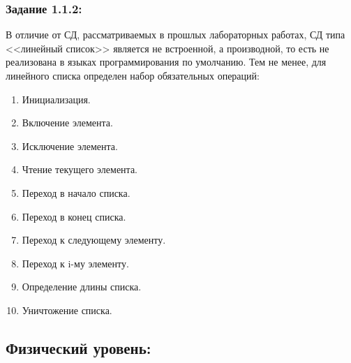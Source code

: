 \documentclass[12pt]{article}
\begin{document}
{	\subsubsection{Задание 1.1.2:}
	\label{task_1_1_2}
	В отличие от СД, рассматриваемых в прошлых лабораторных работах, СД типа <<линейный список>> является не встроенной, а производной, то есть не реализована в языках программирования по умолчанию. Тем не менее, для линейного списка определен набор обязательных операций:
	\begin{enumerate}
	\item Инициализация.
	\item Включение элемента.
	\item Исключение элемента.
	\item Чтение текущего элемента.
	\item Переход в начало списка.
	\item Переход в конец списка.
	\item Переход к следующему элементу.
	\item Переход к i-му элементу.
	\item Определение длины списка.
	\item Уничтожение списка.
	\end{enumerate}
	
	\subsection{Физический уровень:}
	\label{task_1_2}
}
\end{document}
